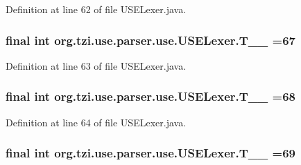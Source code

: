Definition at line 62 of file U\-S\-E\-Lexer.\-java.

\hypertarget{classorg_1_1tzi_1_1use_1_1parser_1_1use_1_1_u_s_e_lexer_a6ab325a4cd4caf7f8eee1356ed8dbeea}{
\subsubsection[{T\-\_\-\-\_\-67}]{\setlength{\rightskip}{0pt plus 5cm}final int org.\-tzi.\-use.\-parser.\-use.\-U\-S\-E\-Lexer.\-T\-\_\-\-\_ =67\hspace{0.3cm}{\ttfamily [static]}}}\label{classorg_1_1tzi_1_1use_1_1parser_1_1use_1_1_u_s_e_lexer_a6ab325a4cd4caf7f8eee1356ed8dbeea}


Definition at line 63 of file U\-S\-E\-Lexer.\-java.

\hypertarget{classorg_1_1tzi_1_1use_1_1parser_1_1use_1_1_u_s_e_lexer_a955f7d0245766bb39b9ac3408d986862}{
\subsubsection[{T\-\_\-\-\_\-68}]{\setlength{\rightskip}{0pt plus 5cm}final int org.\-tzi.\-use.\-parser.\-use.\-U\-S\-E\-Lexer.\-T\-\_\-\-\_ =68\hspace{0.3cm}{\ttfamily [static]}}}\label{classorg_1_1tzi_1_1use_1_1parser_1_1use_1_1_u_s_e_lexer_a955f7d0245766bb39b9ac3408d986862}


Definition at line 64 of file U\-S\-E\-Lexer.\-java.

\hypertarget{classorg_1_1tzi_1_1use_1_1parser_1_1use_1_1_u_s_e_lexer_abd5aca1eaefe71bbd8c25e3ad607b1a8}{
\subsubsection[{T\-\_\-\-\_\-69}]{\setlength{\rightskip}{0pt plus 5cm}final int org.\-tzi.\-use.\-parser.\-use.\-U\-S\-E\-Lexer.\-T\-\_\-\-\_ =69\hspace{0.3cm}{\ttfamily [static]}}}\label{classorg_1_1tzi_1_1use_1_1parser_1_1use_1_1_u_s_e_lexer_abd5aca1eaefe71bbd8c25e3ad607b1a8}


